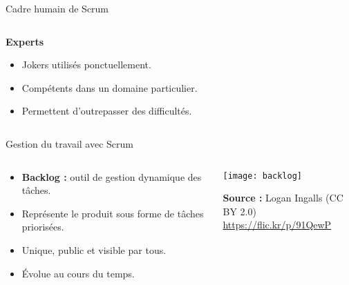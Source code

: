 \begin{frame}{Cadre humain de Scrum}
\begin{columns}
    \begin{column}{.4\textwidth}
        \hspace{2em}\textbf{Experts}
        \begin{itemize}
            \item Jokers utilisés ponctuellement.
            \item Compétents dans un domaine particulier.
            \item Permettent d'outrepasser des difficultés.
        \end{itemize}
    \end{column}%
    \begin{column}{.6\textwidth}
        \newcommand{\scrumfocus}{exp}
        
    \end{column}
\end{columns}
\end{frame}

\begin{frame}{Gestion du travail avec Scrum}
    \begin{columns}
        \begin{column}{.69\textwidth}
            \begin{itemize}
                \item \textbf{Backlog :} outil de gestion dynamique des tâches.
                \item Représente le produit sous forme de tâches priorisées.
                \item Unique, public et visible par tous.
                \item Évolue au cours du temps.
            \end{itemize}
        \end{column}

        \begin{column}{.31\textwidth}
            \texttt{[image: backlog]}

            \hfill{\scriptsize \textbf{Source :} Logan Ingalls (CC BY 2.0)}\\[-.3em]
            \hfill{\scriptsize\url{https://flic.kr/p/91QewP}}
        \end{column}
    \end{columns}
\end{frame}
